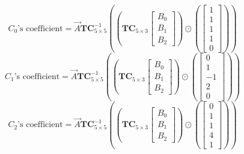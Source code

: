 \documentclass[
11pt,notheorems,hyperref={pdfauthor=whatever}
]{beamer}
\begin{document}
\begin{frame}
    \[
    C_{0}\text{'s coefficient} = \vec{A} \mathbf{TC}_{5\times 5}^{-1} \left(\left(\mathbf{TC}_{5\times 3}\begin{bmatrix}B_{0}\\B_{1}\\B_{2}\end{bmatrix}\right)\odot \left( \begin{bmatrix}1\\1\\1\\1\\0\end{bmatrix} \right)\right)
    \]
    \[
    C_{1}\text{'s coefficient} = \vec{A} \mathbf{TC}_{5\times 5}^{-1} \left(\left(\mathbf{TC}_{5\times 3}\begin{bmatrix}B_{0}\\B_{1}\\B_{2}\end{bmatrix}\right)\odot \left( \begin{bmatrix}0\\1\\-1\\2\\0\end{bmatrix} \right)\right)
    \]
    \[
    C_{2}\text{'s coefficient} = \vec{A} \mathbf{TC}_{5\times 5}^{-1} \left(\left(\mathbf{TC}_{5\times 3}\begin{bmatrix}B_{0}\\B_{1}\\B_{2}\end{bmatrix}\right)\odot \left( \begin{bmatrix}0\\1\\1\\4\\1\end{bmatrix} \right)\right)
    \]
\end{frame}
\end{document}
